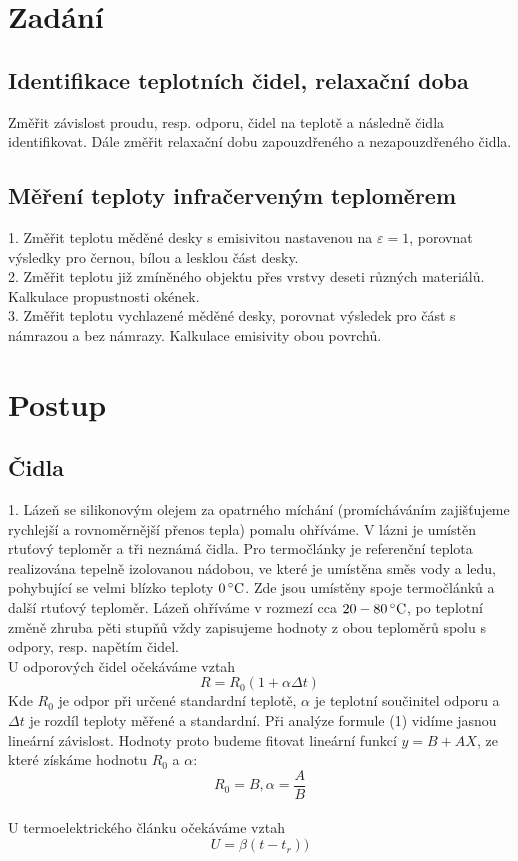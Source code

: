 \documentclass[czech,11pt,a4paper]{article}
\begin{document}
	
	\section{Zadání}
	\subsection{Identifikace teplotních čidel, relaxační doba}
	Změřit závislost proudu, resp. odporu, čidel na teplotě a následně čidla identifikovat. Dále změřit relaxační dobu zapouzdřeného a nezapouzdřeného čidla.
	\subsection{Měření teploty infračerveným teploměrem}
	1. Změřit teplotu měděné desky s emisivitou nastavenou na $\varepsilon = 1$, porovnat výsledky pro černou, bílou a lesklou část desky.\\
	2. Změřit teplotu již zmíněného objektu přes vrstvy deseti různých materiálů. Kalkulace propustnosti okének.\\
	3. Změřit teplotu vychlazené měděné desky, porovnat výsledek pro část s námrazou a bez námrazy. Kalkulace emisivity obou povrchů.
	\section{Postup}
	\subsection{Čidla}
	1. Lázeň se silikonovým olejem za opatrného míchání (promícháváním zajišťujeme rychlejší a rovnoměrnější přenos tepla) pomalu ohříváme. V lázni je umístěn rtuťový teploměr a tři neznámá čidla. Pro termočlánky je referenční teplota realizována tepelně izolovanou nádobou, ve které je umístěna směs vody a ledu, pohybující se velmi blízko teploty $0 \, ^{\circ} \rm C$. Zde jsou umístěny spoje termočlánků a další rtuťový teploměr. Lázeň ohříváme v rozmezí cca $20 - 80 \, ^\circ \rm C$, po teplotní změně zhruba pěti stupňů vždy zapisujeme hodnoty z obou teploměrů spolu s odpory, resp. napětím čidel.\\
	U odporových čidel očekáváme vztah
	\begin{equation}
		R = R_0 (1 + \alpha \Delta t)
	\end{equation}
	Kde $R_0$ je odpor při určené standardní teplotě, $\alpha$ je teplotní součinitel odporu a $\Delta t$ je rozdíl teploty měřené a standardní. Při analýze formule (1) vidíme jasnou lineární závislost. Hodnoty proto budeme fitovat lineární funkcí $y = B + AX$, ze které získáme hodnotu $R_0$ a $\alpha$:
	\begin{equation}
		R_0 = B, \alpha = \frac A B
	\end{equation}
	\\
	U termoelektrického článku očekáváme vztah
	\begin{equation}
		U = \beta(t - t_r))
	\end{equation}
\end{document}
